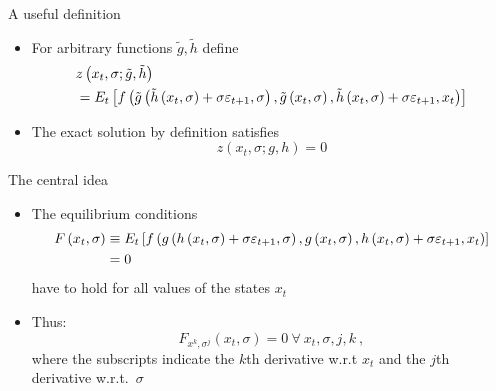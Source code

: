 \begin{frame}{A useful definition}
  \begin{itemize}
    \item For arbitrary functions $\tilde g, \tilde h$ define
          \begin{align}
             & z\left( {{x_t},\sigma ;\tilde g,\tilde h} \right)                                                                                                                                                                                                                      \\
             & = {E_t}\left[ f\left(\tilde g\left( {\tilde h\left( {{x_t},\sigma } \right) + \sigma {\varepsilon _{t + 1}},\sigma } \right),\tilde g\left( {{x_t},\sigma } \right),\tilde h\left( {{x_t},\sigma } \right) + \sigma {\varepsilon _{t + 1}},{x_t}\right) \right] \notag
          \end{align}
    \item The exact solution by definition satisfies
          \begin{equation}
            z\left( {x_t},\sigma ;g, h \right) = 0 \label{eq:exact_solution}
          \end{equation}
  \end{itemize}
\end{frame}

\begin{frame}{The central idea}
  \begin{itemize}
    \item The equilibrium conditions
          \begin{align}
            F\left( {{x_t},\sigma } \right) & \equiv {E_t}\left[ f\left(g\left( {h\left( {{x_t},\sigma } \right) + \sigma {\varepsilon _{t + 1}},\sigma } \right),g\left( {{x_t},\sigma } \right),h\left( {{x_t},\sigma } \right) + \sigma {\varepsilon _{t + 1}},{x_t}\right) \right] \notag \\
                                            & = 0
          \end{align}
          have to hold for all values of the states $x_t$
    \item Thus: 
          \begin{equation}
            {F_{{x^k},{\sigma ^j}}}\left( {{x_t},\sigma } \right) = 0 \: \forall \:  {x_t},\sigma ,j,k \: ,
          \end{equation}
          where the subscripts indicate the $k$th derivative w.r.t $x_t$ and the $j$th derivative w.r.t.\ $\sigma$
  \end{itemize}
\end{frame}

